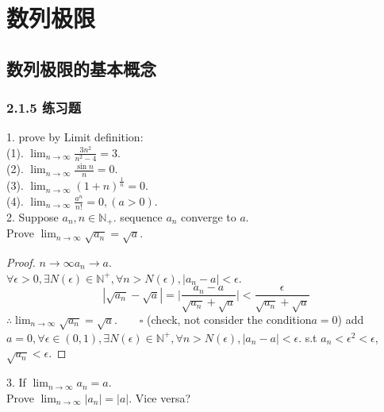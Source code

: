 \chapter{数列极限}
\section{数列极限的基本概念}
\subsection{2.1.5 练习题}
\date{2021.5.5}
1. prove by Limit definition:\\
(1). $ \lim_{n\rightarrow\infty}\frac{3n^2}{n^2-4} = 3 $.\\
(2). $ \lim_{n\rightarrow\infty}\frac{\sin n}{n} = 0 $.\\
(3). $ \lim_{n\rightarrow\infty}(1+n)^\frac{1}{n} = 0 $.\\
(4). $ \lim_{n\rightarrow\infty}\frac{a^n}{n!} = 0, (a>0) $.\\

2. Suppose $ a_n, n\in\mathbb{N}_+ $. sequence {$ a_n $} converge to $ a $.\\ Prove $ \lim_{n\rightarrow\infty}\sqrt{a_n} = \sqrt{a} $.

\begin{proof}
$ n\rightarrow\infty  a_n \rightarrow a $.\\
$ \forall \epsilon >0, \exists N(\epsilon) \in \mathbb{N}^+, \forall n>N(\epsilon), |a_n - a|<\epsilon $.
\begin{equation*}
	|\sqrt{a_n}-\sqrt{a}| = \Big|\frac{a_n-a}{\sqrt{a_n}+\sqrt{a}}\Big| < \frac{\epsilon}{\sqrt{a_n}+\sqrt{a}}
\end{equation*}
$ \therefore \lim_{n\rightarrow\infty}\sqrt{a_n} = \sqrt{a}. \qquad\square  $
(check, not consider the condition$ a=0 $)
add $ a=0, \forall \epsilon \in (0,1), \exists N(\epsilon) \in \mathbb{N}^+, \forall n>N(\epsilon), |a_n - a|<\epsilon $. s.t $ a_n<\epsilon^2 <\epsilon $, $ \sqrt{a_n} < \epsilon $.
\end{proof}

3. If $ \lim_{n\rightarrow\infty} a_n = a $.\\ Prove $ \lim_{n\rightarrow\infty} |a_n| = |a| $. Vice versa?\\

